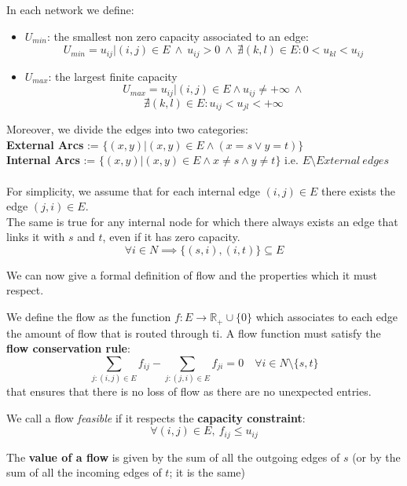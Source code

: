 \begin{definition}
    In each network we define:
    \begin{itemize}
        \item $U_{min}$: the smallest non zero capacity associated to an edge:
        \[U_{min} = u_{ij} | (i,j) \in E\ \land\ u_{ij} > 0\ \land\ \nexists (k,l) \in E : 0<u_{kl}<u_{ij}\]
        \item $U_{max}$: the largest finite capacity
        \[U_{max} = u_{ij}| (i,j) \in E\land u_{ij} \not = + \infty\ \land \]
        \[\nexists (k,l) \in E : u_{ij}< u_{jl} < +\infty \]
    \end{itemize}
\end{definition}
Moreover, we divide the edges into two categories:\\
\textbf{External Arcs} := $\{(x,y) | (x,y)\in E \land (x = s \lor y = t)\}$\\
\textbf{Internal Arcs} := $\{(x,y) | (x,y)\in E \land x \not = s \land y \not = t\}$ i.e. $E \setminus External\ edges$\\
\\
For simplicity, we assume that for each internal edge $(i,j)\in E$ there exists the edge $(j,i) \in E$.\\ The same is true for any internal node for which there always exists an edge that links it with $s$ and $t$, even if it has zero capacity.
\[\forall i \in N \implies \{(s,i),(i,t)\} \subseteq E\]

We can now give a formal definition of flow and the properties which it must respect.
\begin{definition}[Flow]
    We define the flow as the function $f: E \rightarrow\mathbb{R}_+ \cup \{0\}$ which associates to each edge the amount of flow that is routed through ti.
    A flow function must satisfy the \textbf{flow conservation rule}:
    \[\sum_{j:(i,j) \in E} f_{ij} - \sum_{j:(j,i) \in E}f_{ji} = 0 \quad \forall i \in N\setminus\{s,t\}\]
    that ensures that there is no loss of flow as there are no unexpected entries.
\end{definition}

We call a flow \textit{feasible} if it respects the \textbf{capacity constraint}: \[\forall (i,j) \in E,\ f_{ij} \le u_{ij}\]

\begin{definition}

The \textbf{value of a flow} is given by the sum of all the outgoing edges of $s$ (or by the sum of all the incoming edges of $t$; it is the same)   
\end{definition}


